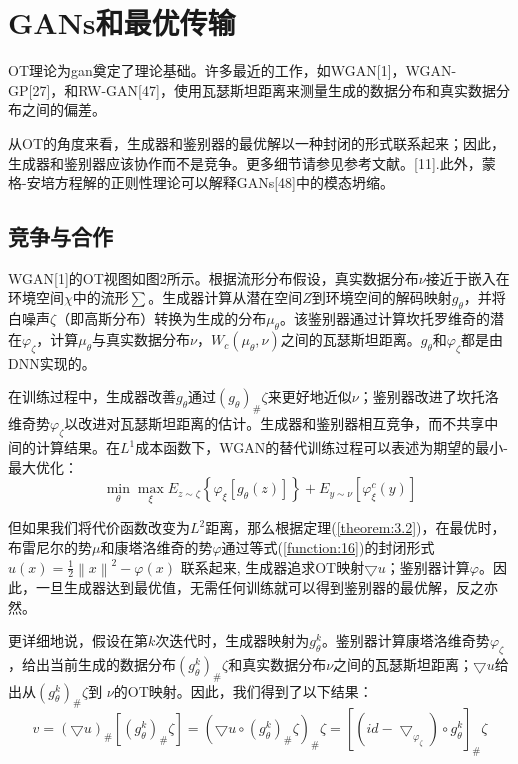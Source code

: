 
\section{GANs和最优传输}

OT理论为gan奠定了理论基础。许多最近的工作，如WGAN[1]，WGAN-GP[27]，和RW-GAN[47]，使用瓦瑟斯坦距离来测量生成的数据分布和真实数据分布之间的偏差。

从OT的角度来看，生成器和鉴别器的最优解以一种封闭的形式联系起来；因此，生成器和鉴别器应该协作而不是竞争。更多细节请参见参考文献。[11].此外，蒙格-安培方程解的正则性理论可以解释GANs[48]中的模态坍缩。

\subsection{竞争与合作}

WGAN[1]的OT视图如图2所示。根据流形分布假设，真实数据分布$\nu$接近于嵌入在环境空间$\chi $中的流形$\sum$。生成器计算从潜在空间$Z$到环境空间的解码映射$g_\theta$，并将白噪声$\zeta$（即高斯分布）转换为生成的分布$\mu _{\theta}$。该鉴别器通过计算坎托罗维奇的潜在$\varphi _{\zeta}$，计算$\mu _{\theta}$与真实数据分布$\nu$，$W_c(\mu _{\theta},\nu)$之间的瓦瑟斯坦距离。$g_{\theta}$和$\varphi _{\zeta}$都是由DNN实现的。

在训练过程中，生成器改善$g_{\theta}$通过$(g_{\theta})_{\#} \zeta$来更好地近似$\nu$；鉴别器改进了坎托洛维奇势$\varphi _{\zeta}$以改进对瓦瑟斯坦距离的估计。生成器和鉴别器相互竞争，而不共享中间的计算结果。在$L^1$成本函数下，WGAN的替代训练过程可以表述为期望的最小-最大优化：
\begin{equation*}
	\min_{\theta } \max_{\xi } E_{z\sim \zeta } \left \{ \varphi _{\xi } \left [ g_{\theta } (z) \right ]   \right \} + E_{y\sim \nu}\left [ \varphi_{\xi}^c (y) \right ]  
\end{equation*}

但如果我们将代价函数改变为$L^2$距离，那么根据定理(\ref{theorem:3.2})，在最优时，布雷尼尔的势$\mu$和康塔洛维奇的势$\varphi$通过等式(\ref{function:16})的封闭形式 $u(x)=\frac{1}{2} \left \| x \right \|^2 -\varphi(x)$ 联系起来, 生成器追求OT映射$\bigtriangledown u$；鉴别器计算$\varphi$。因此，一旦生成器达到最优值，无需任何训练就可以得到鉴别器的最优解，反之亦然。

更详细地说，假设在第$k$次迭代时，生成器映射为$g_{\theta}^k$。鉴别器计算康塔洛维奇势$\varphi_{\zeta}$，给出当前生成的数据分布$\left ( g_{\theta}^k \right )_{\#} \zeta $和真实数据分布$\nu$之间的瓦瑟斯坦距离；$\bigtriangledown u$给出从$\left ( g_{\theta}^k \right )_{\#} \zeta $到 $\nu$的OT映射。因此，我们得到了以下结果：
\begin{equation*}
	v=(\bigtriangledown u)_{\#} \left [ \left ( g_{\theta}^k \right )_{\#} \zeta \right ] =\left ( \bigtriangledown u\circ \left ( g_{\theta}^k \right )_{\#} \zeta \right )_{\#} \zeta =\left [ (id-\bigtriangledown _{\varphi _{\zeta}}) \circ g_{\theta}^k \right ] _{\#} \zeta
\end{equation*}

